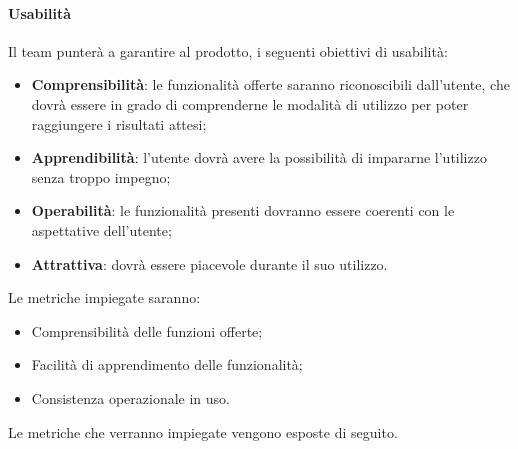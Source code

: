 \documentclass[../PianoDiQualifica.tex]{subfiles}
\begin{document}
			\paragraph{Usabilità}
			Il team punterà a garantire al prodotto, i seguenti obiettivi di usabilità:
			\begin{itemize}
				\item \textbf{Comprensibilità}: le funzionalità offerte saranno riconoscibili dall'utente, che dovrà essere in grado di comprenderne le modalità di utilizzo per poter raggiungere i risultati attesi;
				\item \textbf{Apprendibilità}: l'utente dovrà avere la possibilità di impararne l'utilizzo senza troppo impegno;
				\item \textbf{Operabilità}: le funzionalità presenti dovranno essere coerenti con le aspettative dell'utente;
				\item \textbf{Attrattiva}: dovrà essere piacevole durante il suo utilizzo.
			\end{itemize}
			Le metriche impiegate saranno:
			\begin{itemize}
				\item Comprensibilità delle funzioni offerte;
				\item Facilità di apprendimento delle funzionalità;
				\item Consistenza operazionale in uso.
			\end{itemize}
			Le metriche che verranno impiegate vengono esposte di seguito.
\end{document}
